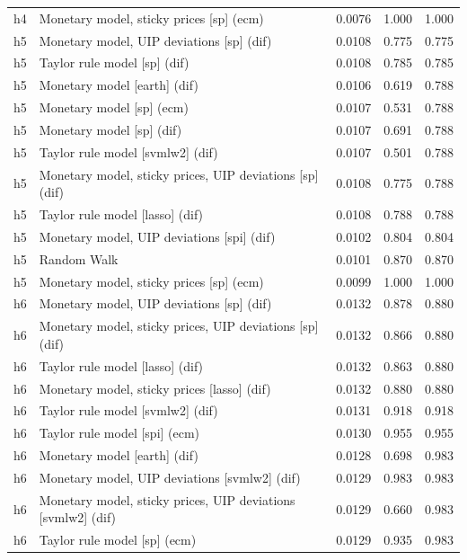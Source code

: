 \begin{ThreePartTable}
\begin{longtable}[t]{cp{5.5cm}ccc}
h4 & \raggedright Monetary model, sticky prices [sp] (ecm) & 0.0076 & 1.000 & 1.000\\
\addlinespace
h5 & \raggedright Monetary model, UIP deviations [sp] (dif) & 0.0108 & 0.775 & 0.775\\
h5 & \raggedright Taylor rule model [sp] (dif) & 0.0108 & 0.785 & 0.785\\
h5 & \raggedright Monetary model [earth] (dif) & 0.0106 & 0.619 & 0.788\\
h5 & \raggedright Monetary model [sp] (ecm) & 0.0107 & 0.531 & 0.788\\
h5 & \raggedright Monetary model [sp] (dif) & 0.0107 & 0.691 & 0.788\\
h5 & \raggedright Taylor rule model [svmlw2] (dif) & 0.0107 & 0.501 & 0.788\\
h5 & \raggedright Monetary model, sticky prices, UIP deviations [sp] (dif) & 0.0108 & 0.775 & 0.788\\
h5 & \raggedright Taylor rule model [lasso] (dif) & 0.0108 & 0.788 & 0.788\\
h5 & \raggedright Monetary model, UIP deviations [spi] (dif) & 0.0102 & 0.804 & 0.804\\
h5 & \raggedright Random Walk & 0.0101 & 0.870 & 0.870\\
h5 & \raggedright Monetary model, sticky prices [sp] (ecm) & 0.0099 & 1.000 & 1.000\\
\addlinespace
h6 & \raggedright Monetary model, UIP deviations [sp] (dif) & 0.0132 & 0.878 & 0.880\\
h6 & \raggedright Monetary model, sticky prices, UIP deviations [sp] (dif) & 0.0132 & 0.866 & 0.880\\
h6 & \raggedright Taylor rule model [lasso] (dif) & 0.0132 & 0.863 & 0.880\\
h6 & \raggedright Monetary model, sticky prices [lasso] (dif) & 0.0132 & 0.880 & 0.880\\
h6 & \raggedright Taylor rule model [svmlw2] (dif) & 0.0131 & 0.918 & 0.918\\
h6 & \raggedright Taylor rule model [spi] (ecm) & 0.0130 & 0.955 & 0.955\\
h6 & \raggedright Monetary model [earth] (dif) & 0.0128 & 0.698 & 0.983\\
h6 & \raggedright Monetary model, UIP deviations [svmlw2] (dif) & 0.0129 & 0.983 & 0.983\\
h6 & \raggedright Monetary model, sticky prices, UIP deviations [svmlw2] (dif) & 0.0129 & 0.660 & 0.983\\
h6 & \raggedright Taylor rule model [sp] (ecm) & 0.0129 & 0.935 & 0.983\\

\end{longtable}
\end{ThreePartTable}
